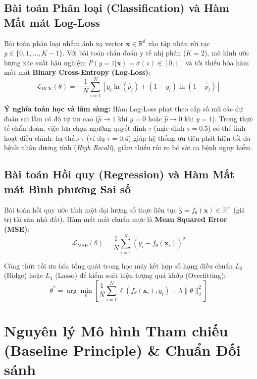 \documentclass[12pt,a4paper]{report}
\begin{document}
\subsection{Bài toán Phân loại (Classification) và Hàm Mất mát Log-Loss}
Bài toán phân loại nhằm ánh xạ vector $\mathbf{x} \in \mathbb{R}^d$ vào tập nhãn rời rạc $y \in \{0, 1, \dots, K-1\}$. Với bài toán chẩn đoán y tế nhị phân ($K=2$), mô hình ước lượng xác suất hậu nghiệm $P(y=1|\mathbf{x}) = \sigma(z) \in [0, 1]$ và tối thiểu hóa hàm mất mát \textbf{Binary Cross-Entropy (Log-Loss)}:
\begin{equation}
\mathcal{L}_{\text{BCE}}(\theta) = -\frac{1}{N} \sum_{i=1}^N \left[ y_i \ln(\hat{p}_i) + (1 - y_i) \ln(1 - \hat{p}_i) \right]
\end{equation}

\textbf{Ý nghĩa toán học và lâm sàng:} Hàm Log-Loss phạt theo cấp số mũ các dự đoán sai lầm có độ tự tin cao ($\hat{p} \to 1$ khi $y=0$ hoặc $\hat{p} \to 0$ khi $y=1$). Trong thực tế chẩn đoán, việc lựa chọn ngưỡng quyết định $\tau$ (mặc định $\tau = 0.5$) có thể linh hoạt điều chỉnh: hạ thấp $\tau$ (ví dụ $\tau = 0.4$) giúp hệ thống ưu tiên phát hiện tối đa bệnh nhân dương tính (\textit{High Recall}), giảm thiểu rủi ro bỏ sót ca bệnh nguy hiểm.

\subsection{Bài toán Hồi quy (Regression) và Hàm Mất mát Bình phương Sai số}
Bài toán hồi quy ước tính một đại lượng số thực liên tục $\hat{y} = f_\theta(\mathbf{x}) \in \mathbb{R}^+$ (giá trị tài sản nhà đất). Hàm mất mát chuẩn mực là \textbf{Mean Squared Error (MSE)}:
\begin{equation}
\mathcal{L}_{\text{MSE}}(\theta) = \frac{1}{N} \sum_{i=1}^N (y_i - f_\theta(\mathbf{x}_i))^2
\end{equation}

Công thức tối ưu hóa tổng quát trong học máy kết hợp số hạng điều chuẩn $L_2$ (Ridge) hoặc $L_1$ (Lasso) để kiểm soát hiện tượng quá khớp (Overfitting):
\begin{equation}
\theta^* = \arg\min_{\theta} \left[ \frac{1}{N} \sum_{i=1}^N \ell(f_\theta(\mathbf{x}_i), y_i) + \lambda \|\theta\|_2^2 \right]
\end{equation}

\section{Nguyên lý Mô hình Tham chiếu (Baseline Principle) \& Chuẩn Đối sánh}
\end{document}
